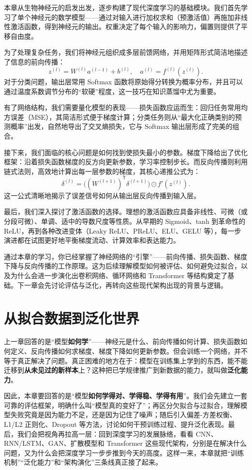 \documentclass[lang=cn,zihao=-4,a4paper,fontset=windows]{beautybook}
\begin{document}
本章从生物神经元的启发出发，逐步构建了现代深度学习的基础模块。我们首先学习了单个神经元的数学模型——通过对输入进行加权求和（预激活值）再施加非线性激活函数，得到神经元的输出。权重决定了每个输入的影响力，偏置则提供了平移自由度。

为了处理复杂任务，我们将神经元组织成多层前馈网络，并用矩阵形式简洁地描述了信息的前向传播：
\[
z^{(l)} = W^{(l)} a^{(l-1)} + b^{(l)}, \quad a^{(l)} = f^{(l)}(z^{(l)}).
\]
对于分类问题，输出层常用 Softmax 函数将原始得分转换为概率分布，并且可以通过温度系数调节分布的“软硬”程度，这一技巧在知识蒸馏中尤为重要。

有了网络结构，我们需要量化模型的表现——损失函数应运而生：回归任务常用均方误差（MSE），其简洁形式便于梯度计算；分类任务则从“最大化正确类别的预测概率”出发，自然地导出了交叉熵损失，它与 Softmax 输出层形成了完美的组合。

接下来，我们面临的核心问题是如何找到使损失最小的参数。梯度下降给出了优化框架：沿着损失函数梯度的反方向更新参数，学习率控制步长。而反向传播则利用链式法则，高效地计算出每一层参数的梯度，其核心递推公式为：
\[
\delta^{(l)} = \big((W^{(l+1)})^{\mathsf{T}} \delta^{(l+1)}\big) \odot f'(z^{(l)}).
\]
这一公式清晰地揭示了误差信号如何从输出层反向传播到输入层。

最后，我们深入探讨了激活函数的选择。理想的激活函数应具备非线性、可微（或分段可微）、单调、适中的导数尺度等性质。从早期的 Sigmoid、tanh 到革命性的 ReLU，再到各种改进变体（Leaky ReLU、PReLU、ELU、GELU 等），每一步演进都在试图更好地平衡梯度流动、计算效率和表达能力。

通过本章的学习，你已经掌握了神经网络的“引擎”——前向传播、损失函数、梯度下降与反向传播的工作原理。这为后续理解模型如何被评估、如何避免过拟合，以及为什么会进一步演化出卷积网络、循环网络和 Transformer 等结构奠定了基础。下一章会先讨论评估与泛化，再转向这些现代架构出现的背景与逻辑。

\chapter{从拟合数据到泛化世界}


上一章回答的是“模型\textbf{如何学}”——神经元是什么、前向传播如何计算、损失函数如何定义、反向传播如何求梯度、梯度下降如何更新参数。但会训练一个网络，并不等于真正解决了问题。真正困难的地方在于：模型在训练集上学到的东西，能不能迁移到\textbf{从未见过的新样本}上？这种把已学规律推广到新数据的能力，就叫做\textbf{泛化能力}。

因此，本章要回答的是“模型\textbf{如何学得对、学得稳、学得有用}”。我们会先建立一套可靠的评估框架，明确什么叫“模型真的变好了”；再区分欠拟合与过拟合，理解模型失败究竟是因为能力不足，还是因为记住了噪声；随后引入偏差-方差权衡、L1/L2 正则化、Dropout 等方法，讨论如何干预训练过程、提升泛化表现。最后，我们会把视角再拉高一层：回到深度学习的发展脉络，看看 CNN、RNN/LSTM、GAN、扩散模型和 Transformer 这些现代架构，分别是在解决什么问题，又为什么会把深度学习一步步推到今天的高度。这样一来，本章就把“训练机制”“泛化能力”和“架构演化”三条线真正接了起来。
\end{document}
